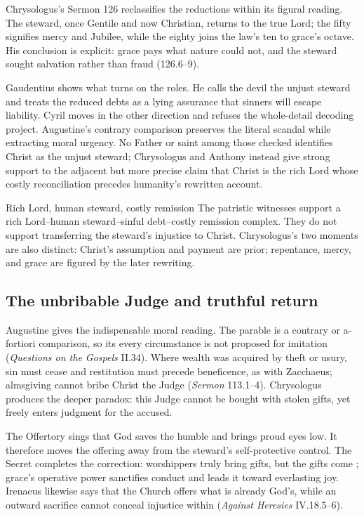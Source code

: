 Chrysologus's Sermon 126 reclassifies the reductions within its figural reading. The steward, once Gentile and now Christian, returns to the true Lord; the fifty signifies mercy and Jubilee, while the eighty joins the law's ten to grace's octave. His conclusion is explicit: grace pays what nature could not, and the steward sought salvation rather than fraud (126.6--9).

Gaudentius shows what turns on the roles. He calls the devil the unjust steward and treats the reduced debts as a lying assurance that sinners will escape liability. Cyril moves in the other direction and refuses the whole-detail decoding project. Augustine's contrary comparison preserves the literal scandal while extracting moral urgency. No Father or saint among those checked identifies Christ as the unjust steward; Chrysologus and Anthony instead give strong support to the adjacent but more precise claim that Christ is the rich Lord whose costly reconciliation precedes humanity's rewritten account.

\begin{studybox}{Rich Lord, human steward, costly remission}
The patristic witnesses support a rich Lord--human steward--sinful debt--costly remission complex. They do not support transferring the steward's injustice to Christ. Chrysologus's two moments are also distinct: Christ's assumption and payment are prior; repentance, mercy, and grace are figured by the later rewriting.
\end{studybox}

\sectionguard
\subsection*{The unbribable Judge and truthful return\enspace{}}

Augustine gives the indispensable moral reading. The parable is a contrary or a-fortiori comparison, so its every circumstance is not proposed for imitation (\emph{Questions on the Gospels} II.34). Where wealth was acquired by theft or usury, sin must cease and restitution must precede beneficence, as with Zacchaeus; almsgiving cannot bribe Christ the Judge (\emph{Sermon} 113.1--4). Chrysologus produces the deeper paradox: this Judge cannot be bought with stolen gifts, yet freely enters judgment for the accused.

The Offertory sings that God saves the humble and brings proud eyes low. It therefore moves the offering away from the steward's self-protective control. The Secret completes the correction: worshippers truly bring gifts, but the gifts come ; grace's operative power sanctifies conduct and leads it toward everlasting joy. Irenaeus likewise says that the Church offers what is already God's, while an outward sacrifice cannot conceal injustice within (\emph{Against Heresies} IV.18.5--6).

